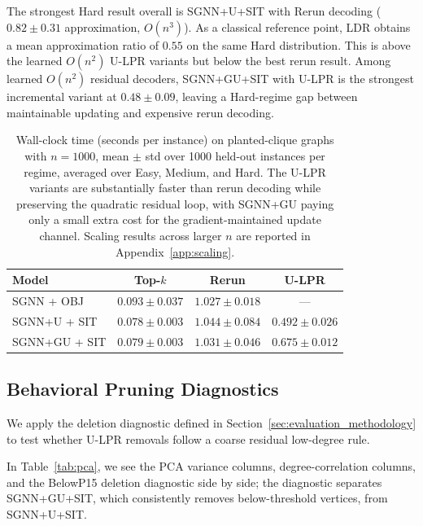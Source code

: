 \documentclass[mathematics,article,submit,pdftex,moreauthors]{Definitions/mdpi}
\begin{document}
The strongest Hard result overall is \textsc{SGNN+U}+SIT with Rerun decoding
($0.82{\pm}0.31$ approximation, $O(n^3)$). As a classical reference point, LDR
obtains a mean approximation ratio of $0.55$ on the same Hard distribution. This is
above the learned $O(n^2)$ U-LPR variants but below the best rerun result. Among
learned $O(n^2)$ residual decoders, \textsc{SGNN+GU}+SIT with U-LPR is the strongest
incremental variant at $0.48{\pm}0.09$, leaving a Hard-regime gap between
maintainable updating and expensive rerun decoding.

\begin{table}[H]
  \caption{Wall-clock time (seconds per instance) on planted-clique graphs with
    $n=1000$, mean $\pm$ std over 1000 held-out instances per regime, averaged over
    Easy, Medium, and Hard. The U-LPR variants are substantially faster than rerun
    decoding while preserving the quadratic residual loop, with \textsc{SGNN+GU} paying only
    a small extra cost for the gradient-maintained update channel. Scaling results
  across larger $n$ are reported in Appendix~\ref{app:scaling}.}
  \label{tab:timing}
  \centering
  \begin{tabular}{lccc}
    \toprule
    Model & Top-$k$ & Rerun & U-LPR \\
    \midrule
    \textsc{SGNN} + OBJ      & $0.093{\pm}0.037$ & $1.027{\pm}0.018$ & --- \\
    \textsc{SGNN+U} + SIT    & $0.078{\pm}0.003$ & $1.044{\pm}0.084$ & $0.492{\pm}0.026$ \\
    \textsc{SGNN+GU} + SIT   & $0.079{\pm}0.003$ & $1.031{\pm}0.046$ & $0.675{\pm}0.012$ \\
    \bottomrule
  \end{tabular}
\end{table}

\subsection{Behavioral Pruning Diagnostics}
\label{sec:diagnostics}

We apply the deletion diagnostic defined in Section~\ref{sec:evaluation_methodology}
to test whether U-LPR removals follow a coarse residual low-degree rule.

In Table~\ref{tab:pca}, we see the PCA variance columns, degree-correlation columns,
and the BelowP15 deletion diagnostic side by side; the diagnostic separates
\textsc{SGNN+GU}+SIT, which consistently removes below-threshold vertices, from
\textsc{SGNN+U}+SIT.
\end{document}
